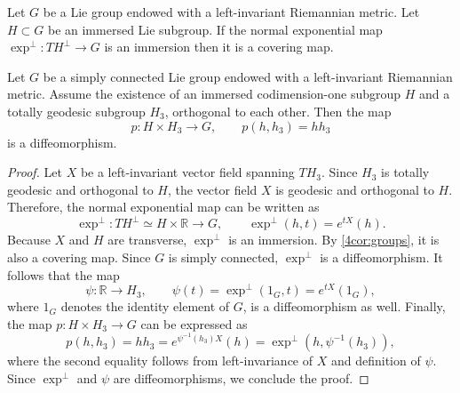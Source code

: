 \documentclass[10pt,a4paper]{amsart}
\begin{document}
\begin{lemma}\label{4cor:groups}
    Let $G$ be a Lie group endowed with a left-invariant Riemannian metric. Let $H\subset G$ be an immersed Lie subgroup. If the normal exponential map $\exp^{\perp}:TH^\perp\to G$ is an immersion then it is a covering map.
\end{lemma}

\begin{lemma}\label{lem:orthogonal_groups}
	Let \(G\) be a simply connected Lie group endowed with a left-invariant Riemannian metric. Assume the existence of an immersed codimension-one subgroup \(H\) and a totally geodesic subgroup \(H_3\), orthogonal to each other. Then the map
	\[
	p:H \times H_3 \longrightarrow G, \qquad p(h,h_3)=hh_3
	\]
	is a diffeomorphism.
\end{lemma}

\begin{proof}
	Let \(X\) be a left-invariant vector field spanning \(TH_3\). Since \(H_3\) is totally geodesic and orthogonal to \(H\), the vector field \(X\) is geodesic and orthogonal to \(H\). Therefore, the normal exponential map can be written as
	\[
	\exp^\perp: TH^{\perp} \simeq H \times \mathbb{R} \to G, \qquad \exp^\perp(h,t) = e^{tX}(h).
	\]
	Because \(X\) and \(H\) are transverse, \(\exp^\perp\) is an immersion. By \cref{4cor:groups}, it is also a covering map. Since \(G\) is simply connected, \(\exp^\perp\) is a diffeomorphism. It follows that the map
	\[
	\psi: \mathbb{R} \to H_3, \qquad \psi(t) =\exp^\perp(1_G,t)=e^{tX}(1_G),
	\]
	where $1_G$ denotes the identity element of $G$, is a diffeomorphism as well. Finally, the map \(p: H \times H_3 \to G\) can be expressed as 
	\[
	p(h,h_3)=hh_3=e^{\psi^{-1}(h_3)X}(h)=\exp^{\perp}(h,\psi^{-1}(h_3)),
	\]
	where the second equality follows from left-invariance of $X$ and definition of $\psi$. Since $\exp^{\perp}$ and $\psi$ are diffeomorphisms, we conclude the proof.
\end{proof}
\end{document}

